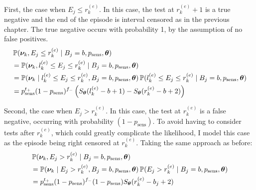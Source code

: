 \documentclass[thesis.tex]{subfiles}
\begin{document}
First, the case when $E_j \leq r_k^{(e)}$.
In this case, the test at $r_k^{(e)}+1$ is a true negative and the end of the episode is interval censored as in the previous chapter.
The true negative occurs with probability 1, by the assumption of no false positives.
\begin{align}
&\prob(\vec{\nu}_k, E_j \leq r_k^{(e)} \mid B_j = b, p_\text{sens}, \vec{\theta}) \\
&= \prob(\vec{\nu}_k, l_k^{(e)} \leq E_j \leq r_k^{(e)} \mid B_j = b, p_\text{sens}, \vec{\theta}) \\ %
&= \prob(\vec{\nu}_k \mid l_k^{(e)} \leq E_j \leq r_k^{(e)}, B_j = b, p_\text{sens}, \vec{\theta}) \prob(l_k^{(e)} \leq E_j \leq r_k^{(e)} \mid B_j = b, p_\text{sens}, \vec{\theta}) \\
&= p_\text{sens}^{t_+} (1 - p_\text{sens})^{f_-} \left( S_{\vec{\theta}}(l_k^{(e)} - b + 1) - S_{\vec{\theta}}(r_k^{(e)} - b + 2) \right)
\label{imperf-test:eq:ll-ei-lt-ri}
\end{align}

Second, the case when $E_j > r_k^{(e)}$.
In this case, the test at $r_k^{(e)}$ is a false negative, occurring with probability $(1 - p_\text{sens})$.
To avoid having to consider tests after $r_k^{(e)}$, which could greatly complicate the likelihood, I model this case as the episode being right censored at $r_k^{(e)}$.
Taking the same approach as before:
\begin{align}
&\operatorname{\mathbb{P}}(\bm{\nu}_k, E_j > r_k^{(e)} \mid B_j = b, p_\text{sens}, \bm{\theta}) \\
&= \operatorname{\mathbb{P}}(\bm{\nu}_k \mid E_j > r_k^{(e)}, B_j = b, p_\text{sens}, \bm{\theta}) \operatorname{\mathbb{P}}(E_j > r_k^{(e)} \mid B_j = b, p_\text{sens}, \bm{\theta}) \\
&= p_\text{sens}^{t_+} (1 - p_\text{sens})^{f_-} (1 - p_\text{sens}) S_{\bm{\theta}}(r_k^{(e)} - b_j + 2)
\label{imperf-test:eq:ll-ei-gt-ri}
\end{align}
\end{document}
